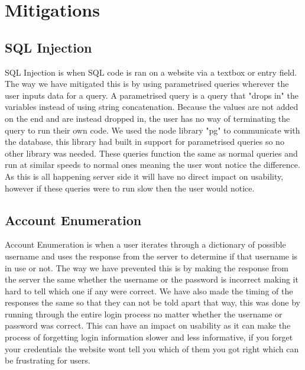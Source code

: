 \documentclass{cmpstyle}
\begin{document}
\section{Mitigations}

\subsection{SQL Injection}
SQL Injection is when SQL code is ran on a website via a textbox or entry field. The way we have mitigated this is by using parametrised queries wherever the user inputs data for a query. A parametrised query is a query that "drops in" the variables instead of using string concatenation. Because the values are not added on the end and are instead dropped in, the user has no way of terminating the query to run their own code. We used the node library "pg" to communicate with the database, this library had built in support for parametrised queries so no other library was needed. These queries function the same as normal queries and run at similar speeds to normal ones meaning the user wont notice the difference. As this is all happening server side it will have no direct impact on usability, however if these queries were to run slow then the user would notice.
\subsection{Account Enumeration}
Account Enumeration is when a user iterates through a dictionary of possible username and uses the response from the server to determine if that username is in use or not. The way we have prevented this is by making the response from the server the same whether the username or the password is incorrect making it hard to tell which one if any were correct. We have also made the timing of the responses the same so that they can not be told apart that way, this was done by running through the entire login process no matter whether the username or password was correct. This can have an impact on usability as it can make the process of forgetting login information slower and less informative, if you forget your credentials the website wont tell you which of them you got right which can be frustrating for users.
\end{document}
